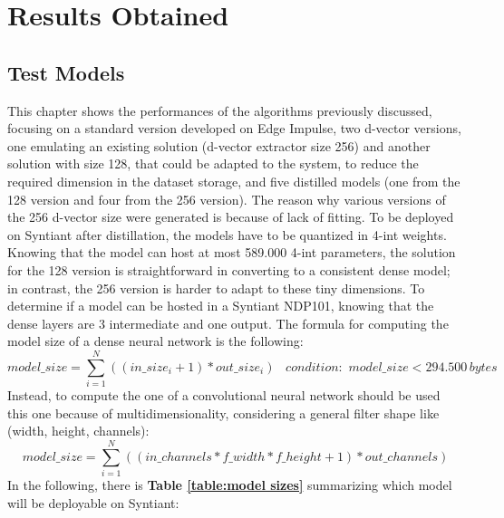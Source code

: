 \chapter{Results Obtained}
\label{cha:results obtained}
\section{Test Models}
\label{sec:test models}
This chapter shows the performances of the algorithms previously discussed, focusing on a standard version developed on Edge Impulse\cite{edgeimpulse_kws_example}, two d-vector versions, one emulating an existing solution\cite{dvector_extractor_TinySV} (d-vector extractor size 256) and another solution with size 128, that could be adapted to the system, to reduce the required dimension in the dataset storage, and five distilled models (one from the 128 version and four from the 256 version). The reason why various versions of the 256 d-vector size were generated is because of lack of fitting. To be deployed on Syntiant after distillation, the models have to be quantized in 4-int weights. Knowing that the model can host at most 589.000 4-int parameters, the solution for the 128 version is straightforward in converting to a consistent dense model; in contrast, the 256 version is harder to adapt to these tiny dimensions. To determine if a model can be hosted in a Syntiant NDP101, knowing that the dense layers are 3 intermediate and one output. The formula for computing the model size of a dense neural network is the following:
\begin{equation*}
    model\_size=\sum_{i=1}^{N}((in\_size_i+1)*out\_size_i)\,\,\,\,\,condition:\,\,model\_size<294.500\,bytes
\end{equation*} 
Instead, to compute the one of a convolutional neural network should be used this one because of multidimensionality, considering a general filter shape like (width, height, channels):
\begin{equation*}
    model\_size=\sum_{i=1}^{N}((in\_channels*f\_width*f\_height+1)*out\_channels)
\end{equation*}
In the following, there is \textbf{Table \ref{table:model sizes}} summarizing which model will be deployable on Syntiant:
